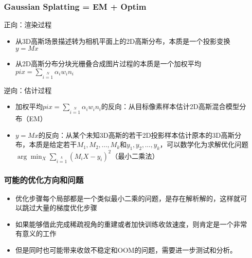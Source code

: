 \begin{frame}
    \frametitle{Gaussian Splatting = EM + Optim}
    正向：渲染过程
    \begin{itemize}
        \item 从3D高斯场景描述转为相机平面上的2D高斯分布，本质是一个投影变换$y=Mx$
        \item 从2D高斯分布分块光栅叠合成图片过程的本质是一个加权平均$pix=\sum\limits_{i=1}\limits^{N} \alpha_i w_in_i$
    \end{itemize}  
    逆向：估计过程
    \begin{itemize}
        \item 加权平均$pix=\sum\limits_{i=1}\limits^{N} \alpha_i w_in_i$的反向：从目标像素样本估计2D高斯混合模型分布（EM）
        \item $y=Mx$的反向：从某个未知3D高斯的若干2D投影样本估计原本的3D高斯分布，本质是给定若干$M_1,M_2,\dots,M_k$和$y_1,y_2,\dots,y_k$，可以数学化为求解优化问题$\arg\min_X \sum\limits_{i=1}\limits^{k} (M_iX-y_i)^2$（最小二乘法）
    \end{itemize}   
\end{frame}

\begin{frame}
    \frametitle{可能的优化方向和问题}
    \begin{itemize}
        \item 优化步骤每个局部都是一个类似最小二乘的问题，是存在解析解的，这样就可以跳过大量的梯度优化步骤
        \item 如果能够借此完成稀疏视角的重建或者加快训练收敛速度，则肯定是一个非常有意义的工作
        \item 但是同时也可能带来收敛不稳定和OOM的问题，需要进一步测试和分析。
    \end{itemize}
\end{frame}
